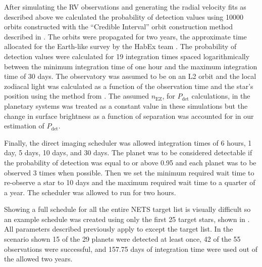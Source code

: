 After simulating the RV observations and generating the radial velocity fits as
described above we calculated the probability of detection values using 10000
orbits constructed with the ``Credible Interval'' orbit construction method
described in . The orbits were propagated for two years,
the approximate time allocated for the Earth-like survey by the HabEx team
\citep{gaudiHabitableExoplanetObservatory2020}. The probability of detection
values were calculated for 19 integration times spaced logarithmically between
the minimum integration time of one hour and the maximum integration time of 30
days. The observatory was assumed to be on an L2 orbit and the local zodiacal light
was calculated as a function of the observation time and the star's position using
the method from .
The assumed $n_\textrm{EZ}$, for $P_\textrm{det}$ calculations, in the
planetary systems was treated as a constant value in these simulations but the
change in surface brightness as a function of separation was accounted for in
our estimation of $P_\textrm{det}$.

Finally, the direct imaging scheduler was allowed integration times of 6 hours,
1 day, 5 days, 10 days, and 30 days. The planet was to be considered detectable
if the probability of detection was equal to or above 0.95 and each planet was
to be observed 3 times when possible. Then we set the minimum required wait
time to re-observe a star to 10 days and the maximum required wait time to a
quarter of a year. The scheduler was allowed to run for two hours.

Showing a full schedule for all the entire NETS target list is visually
difficult so an example schedule was created using only the first 25 target
stars, shown in . All parameters described previously apply
to  except the target list. In the scenario shown 15 of the
29 planets were detected at least once, 42 of the 55 observations were
successful, and 157.75 days of integration time were used out of the allowed
two years.

